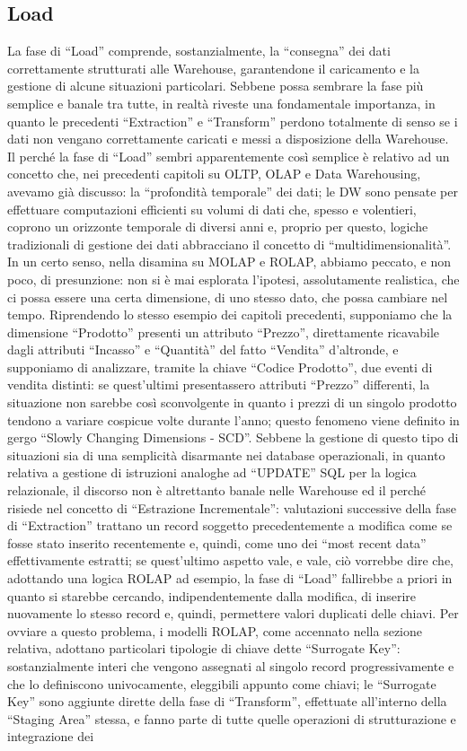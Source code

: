 \documentclass[a4paper,12pt]{report}
\begin{document}
\subsection{Load}
La fase di “Load” comprende, sostanzialmente, la “consegna” dei dati correttamente strutturati alle Warehouse, garantendone il caricamento e la gestione di alcune situazioni particolari. Sebbene possa sembrare la fase più semplice e banale tra tutte, in realtà riveste una fondamentale importanza, in quanto le precedenti “Extraction” e “Transform” perdono totalmente di senso se i dati non vengano correttamente caricati e messi a disposizione della Warehouse. Il perché la fase di “Load” sembri apparentemente così semplice è relativo ad un concetto che, nei precedenti capitoli su OLTP, OLAP e Data Warehousing, avevamo già discusso: la “profondità temporale” dei dati; le DW sono pensate per effettuare computazioni efficienti su volumi di dati che, spesso e volentieri, coprono un orizzonte temporale di diversi anni e, proprio per questo, logiche tradizionali di gestione dei dati abbracciano il concetto di “multidimensionalità”. In un certo senso, nella disamina su MOLAP e ROLAP, abbiamo peccato, e non poco, di presunzione: non si è mai esplorata l’ipotesi, assolutamente realistica, che ci possa essere una certa dimensione, di uno stesso dato, che possa cambiare nel tempo. Riprendendo lo stesso esempio dei capitoli precedenti, supponiamo che la dimensione “Prodotto” presenti un attributo “Prezzo”, direttamente ricavabile dagli attributi “Incasso” e “Quantità” del fatto “Vendita” d’altronde, e supponiamo di analizzare, tramite la chiave “Codice Prodotto”, due eventi di vendita distinti: se quest’ultimi presentassero attributi “Prezzo” differenti, la situazione non sarebbe così sconvolgente in quanto i prezzi di un singolo prodotto tendono a variare cospicue volte durante l’anno; questo fenomeno viene definito in gergo “Slowly Changing Dimensions - SCD”. Sebbene la gestione di questo tipo di situazioni sia di una semplicità disarmante nei database operazionali, in quanto relativa a gestione di istruzioni analoghe ad “UPDATE” SQL per la logica relazionale, il discorso non è altrettanto banale nelle Warehouse ed il perché risiede nel concetto di “Estrazione Incrementale”: valutazioni successive della fase di “Extraction” trattano un record soggetto precedentemente a modifica come se fosse stato inserito recentemente e, quindi, come uno dei “most recent data” effettivamente estratti; se quest’ultimo aspetto vale, e vale, ciò vorrebbe dire che, adottando una logica ROLAP ad esempio, la fase di “Load” fallirebbe a priori in quanto si starebbe cercando, indipendentemente dalla modifica, di inserire nuovamente lo stesso record e, quindi, permettere valori duplicati delle chiavi. Per ovviare a questo problema, i modelli ROLAP, come accennato nella sezione relativa, adottano particolari tipologie di chiave dette “Surrogate Key”: sostanzialmente interi che vengono assegnati al singolo record progressivamente e che lo definiscono univocamente, eleggibili appunto come chiavi; le “Surrogate Key” sono aggiunte dirette della fase di “Transform”, effettuate all’interno della “Staging Area” stessa, e fanno parte di tutte quelle operazioni di strutturazione e integrazione dei 
\end{document}
